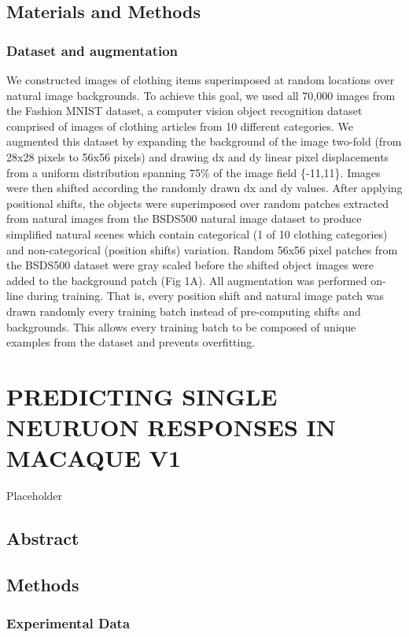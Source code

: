 \documentclass{templates/ucdenverthesis}
\begin{document}
\hypertarget{materials-and-methods}{%
\section{Materials and Methods}\label{materials-and-methods}}

\hypertarget{dataset-and-augmentation}{%
\subsection{Dataset and augmentation}\label{dataset-and-augmentation}}

We constructed images of clothing items superimposed at random locations over natural image backgrounds. To achieve this goal, we used all 70,000 images from the Fashion MNIST dataset, a computer vision object recognition dataset comprised of images of clothing articles from 10 different categories. We augmented this dataset by expanding the background of the image two-fold (from 28x28 pixels to 56x56 pixels) and drawing dx and dy linear pixel displacements from a uniform distribution spanning 75\% of the image field \{-11,11\}. Images were then shifted according the randomly drawn dx and dy values. After applying positional shifts, the objects were superimposed over random patches extracted from natural images from the BSDS500 natural image dataset to produce simplified natural scenes which contain categorical (1 of 10 clothing categories) and non-categorical (position shifts) variation. Random 56x56 pixel patches from the BSDS500 dataset were gray scaled before the shifted object images were added to the background patch (Fig 1A). All augmentation was performed on-line during training. That is, every position shift and natural image patch was drawn randomly every training batch instead of pre-computing shifts and backgrounds. This allows every training batch to be composed of unique examples from the dataset and prevents overfitting.

\hypertarget{ch5:jov}{%
\chapter{PREDICTING SINGLE NEURUON RESPONSES IN MACAQUE V1}\label{ch5:jov}}

Placeholder

\hypertarget{abstract-2}{%
\section*{Abstract}\label{abstract-2}}

\hypertarget{methods}{%
\section{Methods}\label{methods}}

\hypertarget{experimental-data}{%
\subsection{Experimental Data}\label{experimental-data}}

\printbibliography[heading=bibintoc]
\end{document}
